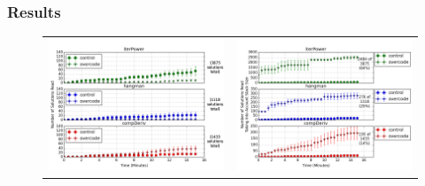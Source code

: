 \documentclass[12pt,twoside]{mitthesis}
\providecommand{\DIFaddbegin}{} %
\providecommand{\DIFaddend}{} %
\providecommand{\DIFdelbegin}{} %
\providecommand{\DIFdelend}{} %
\begin{document}
\DIFdelbegin %
\DIFdelend \DIFaddbegin \subsubsection{Results} \DIFaddend \label{coverageResults}
\begin{figure}[b!]
\begin{tabular}{c | c}
\begin{minipage}{.5\linewidth}
\centering
\includegraphics[width=\linewidth]{Body/figures/overcode/prettyReadCoverage.png}
\end{minipage}
&
\begin{minipage}{.5\linewidth}
\centering
\includegraphics[width=\linewidth]{Body/figures/overcode/prettyPercentCoverage.png}

\end{minipage}
\end{tabular}
\end{figure}
\end{document}
